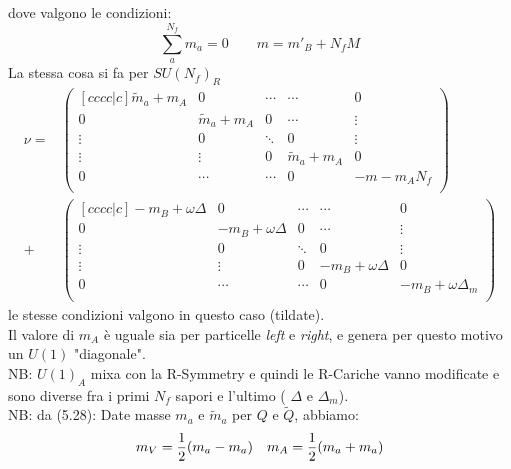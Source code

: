 \documentclass[a4paper,12pt]{article}
\begin{document}
dove valgono le condizioni:
$$
\sum_a^{N_f} m_a = 0 \qquad  m = m'_B + N_f M
$$
La stessa cosa si fa per $SU(N_f)_R$
\begin{align*}
\nu = &
\begin{pmatrix}[c c c c|c]
		\tilde m_a + m_A 	& 0 		& \cdots 	& \cdots 	& 0 \\
		0 			 & \tilde m_a + m_A 	& 0 &\cdots & \vdots \\
		\vdots 		& 0 		& \ddots & 0 & \vdots \\
		\vdots & \vdots & 0 & \tilde m_a + m_A 	 & 0 \\
		\hline
		0 & \cdots & \cdots & 0 & -m  - m_A N_f\\
\end{pmatrix} \\
+ &
\begin{pmatrix}[c c c c|c]
		- m_B + \omega \Delta 	& 0 		& \cdots 	& \cdots 	& 0 \\
		0 			 & - m_B + \omega \Delta  & 0 &\cdots & \vdots \\
		\vdots 		& 0 		& \ddots & 0 & \vdots \\
		\vdots & \vdots & 0 & - m_B + \omega \Delta & 0 \\
		\hline
		0 & \cdots & \cdots & 0 & -m_B + \omega \Delta_m\\
\end{pmatrix}
\end{align*}
le stesse condizioni valgono in questo caso (tildate).\\
Il valore di $m_A$ è uguale sia per particelle \emph{left} e \emph{right}, e genera per questo motivo un $U(1)$ "diagonale".\\
NB: $U(1)_A$ mixa con la R-Symmetry e quindi le R-Cariche vanno modificate e sono diverse fra i primi $N_f$ sapori e l'ultimo ( $\Delta $ e $\Delta_m$).\\

NB: da \citep{Aharony:2013dha} (5.28):
Date masse $m_a$ e $\tilde m_a$ per $Q$ e $\tilde{Q}$, abbiamo:
$$
	m_V = {1 \over 2 }( m_a -  m_a) \quad m_A = {1 \over 2 }( m_a + m_a)
$$
\end{document}
